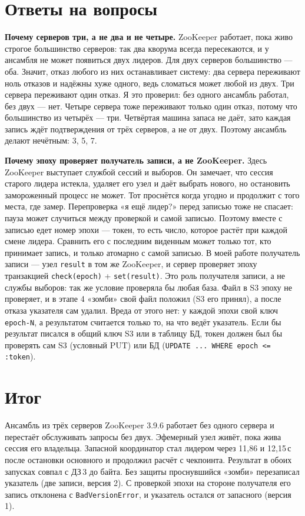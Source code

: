 \documentclass[11pt,a4paper]{article}
\newcommand{\code}[1]{\texttt{#1}}
\begin{document}
\section{Ответы на вопросы}

\textbf{Почему серверов три, а не два и не четыре.} ZooKeeper работает, пока живо строгое большинство серверов: так два кворума всегда пересекаются, и у ансамбля не может появиться двух лидеров. Для двух серверов большинство --- оба. Значит, отказ любого из них останавливает систему: два сервера переживают ноль отказов и надёжны хуже одного, ведь сломаться может любой из двух. Три сервера переживают один отказ. Я это проверил: без одного ансамбль работал, без двух --- нет. Четыре сервера тоже переживают только один отказ, потому что большинство из четырёх --- три. Четвёртая машина запаса не даёт, зато каждая запись ждёт подтверждения от трёх серверов, а не от двух. Поэтому ансамбль делают нечётным: 3, 5, 7.

\textbf{Почему эпоху проверяет получатель записи, а не ZooKeeper.} Здесь ZooKeeper выступает службой сессий и выборов. Он замечает, что сессия старого лидера истекла, удаляет его узел и даёт выбрать нового, но остановить замороженный процесс не может. Тот проснётся когда угодно и продолжит с того места, где замер. Перепроверка «я ещё лидер?» перед записью тоже не спасает: пауза может случиться между проверкой и самой записью. Поэтому вместе с записью едет номер эпохи --- токен, то есть число, которое растёт при каждой смене лидера. Сравнить его с последним виденным может только тот, кто принимает запись, и только атомарно с самой записью. В моей работе получатель записи --- узел \code{result} в том же ZooKeeper, и сервер проверяет эпоху транзакцией \code{check(epoch)} + \code{set(result)}. Это роль получателя записи, а не службы выборов: так же условие проверяла бы любая база. Файл в S3 эпоху не проверяет, и в этапе 4 «зомби» свой файл положил (S3 его принял), а после отказа указателя сам удалил. Вреда от этого нет: у каждой эпохи свой ключ \code{epoch-N}, а результатом считается только то, на что ведёт указатель. Если бы результат писался в общий ключ S3 или в таблицу БД, токен должен был бы проверять сам S3 (условный PUT) или БД (\code{UPDATE ... WHERE epoch <= :token}).

\section{Итог}

Ансамбль из трёх серверов ZooKeeper 3.9.6 работает без одного сервера и перестаёт обслуживать запросы без двух. Эфемерный узел живёт, пока жива сессия его владельца. Запасной координатор стал лидером через 11,86 и 12,15\,с после остановки основного и продолжил расчёт с чекпоинта. Результат в обоих запусках совпал с ДЗ\,3 до байта. Без защиты проснувшийся «зомби» перезаписал указатель (две записи, версия 2). С проверкой эпохи на стороне получателя его запись отклонена с \code{BadVersionError}, и указатель остался от запасного (версия 1).
\end{document}
